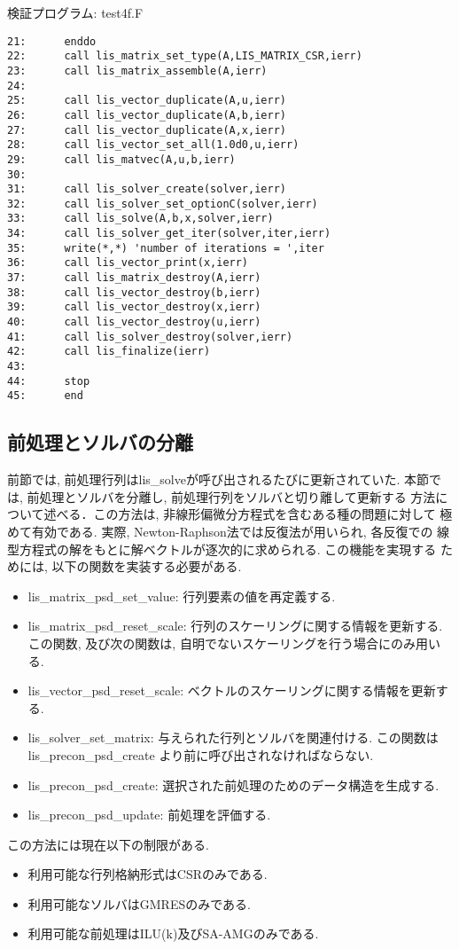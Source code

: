 \documentclass[a4paper]{jarticle}
\begin{document}
{{\begin{itembox}[l]{検証プログラム: test4f.F}
{\begin{verbatim}
21:      enddo
22:      call lis_matrix_set_type(A,LIS_MATRIX_CSR,ierr)
23:      call lis_matrix_assemble(A,ierr)
24:
25:      call lis_vector_duplicate(A,u,ierr)
26:      call lis_vector_duplicate(A,b,ierr)
27:      call lis_vector_duplicate(A,x,ierr)
28:      call lis_vector_set_all(1.0d0,u,ierr)
29:      call lis_matvec(A,u,b,ierr)
30:
31:      call lis_solver_create(solver,ierr)
32:      call lis_solver_set_optionC(solver,ierr)
33:      call lis_solve(A,b,x,solver,ierr)
34:      call lis_solver_get_iter(solver,iter,ierr)
35:      write(*,*) 'number of iterations = ',iter
36:      call lis_vector_print(x,ierr)
37:      call lis_matrix_destroy(A,ierr)
38:      call lis_vector_destroy(b,ierr)
39:      call lis_vector_destroy(x,ierr)
40:      call lis_vector_destroy(u,ierr)
41:      call lis_solver_destroy(solver,ierr)
42:      call lis_finalize(ierr)
43:
44:      stop
45:      end
\end{verbatim}
}
\end{itembox}

\newpage
\subsection{前処理とソルバの分離}
\label{subsec:psd}
前節では, 前処理行列はlis\_solveが呼び出されるたびに更新されていた. 
本節では, 前処理とソルバを分離し, 前処理行列をソルバと切り離して更新する
方法について述べる．この方法は, 非線形偏微分方程式を含むある種の問題に対して
極めて有効である. 実際, Newton-Raphson法では反復法が用いられ, 各反復での
線型方程式の解をもとに解ベクトルが逐次的に求められる. この機能を実現する
ためには, 以下の関数を実装する必要がある.  
%
\begin{itemize}
\item lis\_matrix\_psd\_set\_value: 行列要素の値を再定義する. 
\item lis\_matrix\_psd\_reset\_scale: 行列のスケーリングに関する情報を更新する. この関数, 及び次の関数は, 自明でないスケーリングを行う場合にのみ用いる. 
\item lis\_vector\_psd\_reset\_scale: ベクトルのスケーリングに関する情報を更新する. 
\item lis\_solver\_set\_matrix: 与えられた行列とソルバを関連付ける. この関数は lis\_precon\_psd\_create より前に呼び出されなければならない. 
\item lis\_precon\_psd\_create: 選択された前処理のためのデータ構造を生成する. 
\item lis\_precon\_psd\_update: 前処理を評価する. 
\end{itemize}
%
この方法には現在以下の制限がある. 
%
\begin{itemize}
\item 利用可能な行列格納形式はCSRのみである. 
\item 利用可能なソルバはGMRESのみである. 
\item 利用可能な前処理はILU(k)及びSA-AMGのみである. 
\end{itemize}
%

}}
\end{document}
